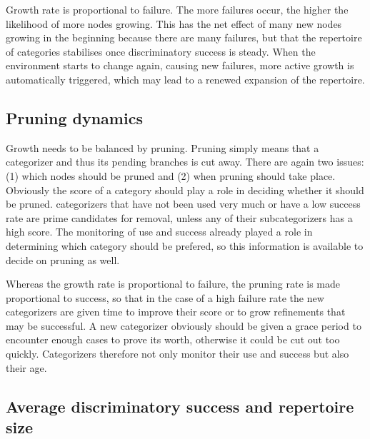 Growth rate is proportional to failure. The more failures 
occur, the higher the likelihood of more nodes growing. This has the 
net effect of many new nodes growing in the beginning because
there are many failures, but that the repertoire of
categories stabilises
once discriminatory success is steady. When the environment 
starts to change again, causing new failures, more active 
growth is automatically triggered, which may lead 
to a renewed expansion of the repertoire. 

\subsection{Pruning dynamics}

Growth needs to be balanced by pruning. Pruning simply means
that a categorizer and thus its pending branches is 
cut away. There are again two
issues: (1) which nodes should be pruned and
(2) when pruning should take place. 
Obviously the score of a category should play a role
in deciding whether it should be pruned. 
categorizers that have not been used very much or have a low
success rate are prime candidates for removal, unless
any of their subcategorizers has a high score. The 
monitoring of use and success already played a role in 
determining which category should be prefered, so this
information is available to decide on pruning as well. 

Whereas the growth rate is proportional to failure, the pruning
rate is made proportional to success, so that 
in the case of a high failure rate the new categorizers are given
time to improve their score or to grow refinements that may be 
successful. A new categorizer obviously should be given
a grace period to encounter enough cases to prove
its worth, otherwise it could be cut out too quickly. Categorizers 
therefore not only monitor their use and success but 
also their age. 

\subsection{Average discriminatory success and repertoire size}

